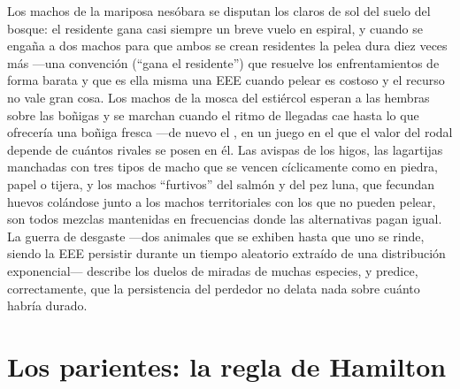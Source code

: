 \begin{example}\label{ex:b3:behavioural-ecology:games}
Los machos de la mariposa nesóbara se disputan los claros de sol del
suelo del bosque: el residente gana casi siempre un breve vuelo en
espiral, y cuando se engaña a dos machos para que ambos se crean
residentes la pelea dura diez veces más ---una convención (``gana el
residente'') que resuelve los enfrentamientos de forma barata y que es
ella misma una EEE cuando pelear es costoso y el recurso no vale gran
cosa. Los machos de la mosca del estiércol esperan a las hembras sobre
las boñigas y se marchan cuando el ritmo de llegadas cae hasta lo que
ofrecería una boñiga fresca ---de nuevo el ,
en un juego en el que el valor del rodal depende de cuántos rivales se
posen en él. Las avispas de los higos, las lagartijas manchadas con
tres tipos de macho que se vencen cíclicamente como en piedra, papel o
tijera, y los machos ``furtivos'' del salmón y del pez luna, que
fecundan huevos colándose junto a los machos territoriales con los que
no pueden pelear, son todos mezclas mantenidas en frecuencias donde las
alternativas pagan igual. La guerra de desgaste ---dos animales que se
exhiben hasta que uno se rinde, siendo la EEE persistir durante un
tiempo aleatorio extraído de una distribución exponencial--- describe
los duelos de miradas de muchas especies, y predice, correctamente, que
la persistencia del perdedor no delata nada sobre cuánto habría durado.
\end{example}

\section{Los parientes: la regla de Hamilton}

